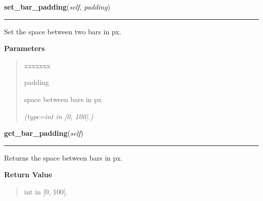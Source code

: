     \label{pygtk_chart:bar_chart:BarChart:set_bar_padding}

    \vspace{0.5ex}

\hspace{.8\funcindent}\begin{boxedminipage}{\funcwidth}

    \raggedright \textbf{set\_bar\_padding}(\textit{self}, \textit{padding})

    \vspace{-1.5ex}

    \rule{\textwidth}{0.5\fboxrule}
\setlength{\parskip}{2ex}
    Set the space between two bars in px.

\setlength{\parskip}{1ex}
      \textbf{Parameters}
      \vspace{-1ex}

      \begin{quote}
        \begin{Ventry}{xxxxxxx}

          \item[padding]

          space between bars in px

            {\it (type=int in [0, 100].)}

        \end{Ventry}

      \end{quote}

    \end{boxedminipage}

    \label{pygtk_chart:bar_chart:BarChart:get_bar_padding}

    \vspace{0.5ex}

\hspace{.8\funcindent}\begin{boxedminipage}{\funcwidth}

    \raggedright \textbf{get\_bar\_padding}(\textit{self})

    \vspace{-1.5ex}

    \rule{\textwidth}{0.5\fboxrule}
\setlength{\parskip}{2ex}
    Returns the space between bars in px.

\setlength{\parskip}{1ex}
      \textbf{Return Value}
    \vspace{-1ex}

      \begin{quote}
      int in [0, 100].

      \end{quote}

    \end{boxedminipage}

